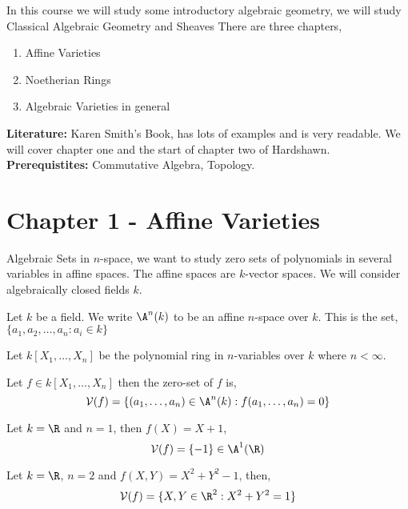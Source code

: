 
\noindent
In this course we will study some introductory algebraic geometry, we will study Classical Algebraic Geometry and Sheaves
There are three chapters,
\begin{enumerate}
  \item Affine Varieties
  \item Noetherian Rings
  \item Algebraic Varieties in general
\end{enumerate}

\noindent
\textbf{Literature: }Karen Smith's Book, has lots of examples and is very readable. We will cover chapter one and the start of chapter two of Hardshawn.\\

\noindent
\textbf{Prerequistites: }Commutative Algebra, Topology.

\section{Chapter 1 - Affine Varieties}
Algebraic Sets in $n$-space, we want to study zero sets of polynomials in several variables in affine spaces. The affine spaces are $k$-vector spaces. We will consider algebraically closed fields $k$. \\

\begin{ndefi}
  Let $k$ be a field. We write $\A^n(k)$ to be an affine $n$-space over $k$. This is the set, $\{a_{1}, a_{2}, \dots, a_n : a_i \in k\}$\\
\end{ndefi}

Let $k[X_1, \dots, X_n]$ be the polynomial ring in $n$-variables over $k$ where $n < \infty$.
\begin{ndefi}
  Let $f \in k[X_1, \dots, X_n]$ then the zero-set of $f$ is,
  $$ \mathcal{V}(f) = \{(a_1, \dots, a_n) \in \A^n(k) : f(a_1, \dots, a_n) = 0\} $$
\end{ndefi}

\begin{eg}
  Let $k = \R$ and $n = 1$, then $f(X) = X + 1$,
  $$ \mathcal{V}(f) = \{-1\} \in \A^1(\R) $$
\end{eg}

\begin{eg}
  Let $k = \R$, $n = 2$ and $f(X, Y) = X^2 + Y^2 - 1$, then,
  $$ \mathcal{V}(f) = \{X, Y \in \R^2 : X^2 + Y^2 = 1\} $$
\end{eg}

